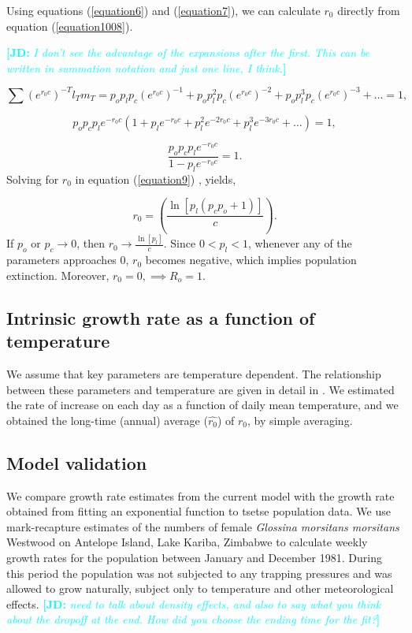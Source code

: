 \documentclass[12pt,a4paper]{article}
\newcommand{\comment}[3]{\textcolor{#1}{\textbf{[#2: }\textsl{#3}\textbf{]}}}
\newcommand{\jd}[1]{\comment{cyan}{JD}{#1}}
\begin{document}
Using equations  (\ref{equation6}) and  (\ref{equation7}), we can calculate $r_0$ directly from equation (\ref{equation1008}).

\jd{I don't see the advantage of the expansions after the first. This can be written in summation notation and just one line, I think.}

$$\sum (e^{r_0c})^{-T}l_{T}m_{T} = p_op_lp_c(e^{r_0c})^{-1} + p_op_l^2p_c(e^{r_0c})^{-2} + p_op_l^3p_c(e^{r_0c})^{-3} + ...=1,$$

$$p_op_cp_le^{-r_0c} (1 + p_le^{-r_0c} + p_l^2e^{-2r_0c} + p_l^3e^{-3r_0c}+ ...) =1,$$

\begin{equation}
\label{equation9} 
\frac{p_op_cp_le^{-r_0c}}{1-p_le^{-r_0c}} =1.
\end{equation}
Solving for $r_0$ in equation (\ref{equation9}) , yields, 

\begin{equation}
\label{equation13} 
r_0 = (\frac{\ln[p_l(p_cp_o+1)]}{c}).
\end{equation}
If  $p_o$ or $p_c \rightarrow{0}$, then  $r_0 \rightarrow{\frac{\ln[p_l]}{c}}$. Since $0 < p_l < 1$, whenever any of the parameters approaches $0$, $r_0$ becomes negative, which implies  population extinction. Moreover, $r_0 = 0, \implies R_o = 1$.  


\subsection*{Intrinsic growth rate as a function of temperature}

We assume that key parameters are temperature dependent. The relationship between these parameters and temperature are given in detail in \cite{Are2019}. We estimated the rate of increase on each day as a function of daily mean temperature, and we obtained the long-time (annual) average ($\hat{r_0}$)  of $r_0$, by simple averaging.

\subsection*{Model validation}
We compare growth rate estimates from the current model with the growth rate obtained from fitting an exponential function to tsetse population data. We use mark-recapture estimates of the numbers of female \textit{Glossina morsitans morsitans} Westwood on Antelope Island, Lake Kariba, Zimbabwe \cite{hargrove1998optimized} to calculate weekly growth rates for the population between January and December 1981. During this period the population was not subjected to any trapping pressures and was allowed to grow naturally, subject only to temperature and other meteorological effects. \jd{need to talk about density effects, and also to say what you think about the dropoff at the end. How did you choose the ending time for the fit?}
\end{document}
